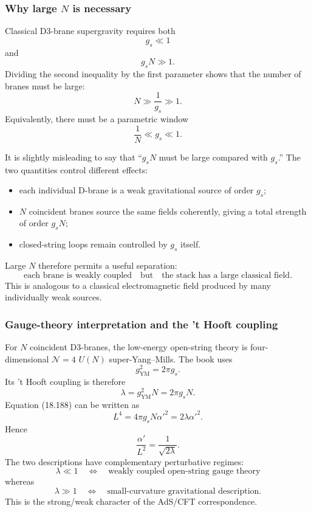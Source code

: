 \documentclass[
  10pt,
  a4paper,
  openany]{book}
\providecommand{\tightlist}{%
  \setlength{\itemsep}{0pt}\setlength{\parskip}{0pt}}
\begin{document}
\subsubsection{\texorpdfstring{Why large \(N\) is
necessary}{Why large N is necessary}}\label{why-large-n-is-necessary}

Classical D3-brane supergravity requires both \[
g_s\ll1
\] and \[
g_sN\gg1.
\] Dividing the second inequality by the first parameter shows that the
number of branes must be large: \[
N\gg\frac1{g_s}\gg1.
\] Equivalently, there must be a parametric window \[
\boxed{
\frac1N\ll g_s\ll1
}.
\]

It is slightly misleading to say that ``\(g_sN\) must be large compared
with \(g_s\).'' The two quantities control different effects:

\begin{itemize}
\tightlist
\item
  each individual D-brane is a weak gravitational source of order
  \(g_s\);
\item
  \(N\) coincident branes source the same fields coherently, giving a
  total strength of order \(g_sN\);
\item
  closed-string loops remain controlled by \(g_s\) itself.
\end{itemize}

Large \(N\) therefore permits a useful separation: \[
\boxed{
\text{each brane is weakly coupled}
\quad\text{but}\quad
\text{the stack has a large classical field}
}.
\] This is analogous to a classical electromagnetic field produced by
many individually weak sources.

\subsubsection{Gauge-theory interpretation and the 't Hooft
coupling}\label{gauge-theory-interpretation-and-the-t-hooft-coupling}

For \(N\) coincident D3-branes, the low-energy open-string theory is
four-dimensional \(\mathcal N=4\) \(U(N)\) super-Yang--Mills. The book
uses \[
g_{\mathrm{YM}}^2=2\pi g_s.
\] Its 't Hooft coupling is therefore \[
\lambda
=g_{\mathrm{YM}}^2N
=2\pi g_sN.
\] Equation (18.188) can be written as \[
L^4
=4\pi g_sN\alpha'^2
=2\lambda\alpha'^2.
\] Hence \[
\frac{\alpha'}{L^2}
=\frac1{\sqrt{2\lambda}}.
\] The two descriptions have complementary perturbative regimes: \[
\boxed{
\lambda\ll1
\quad\Longleftrightarrow\quad
\text{weakly coupled open-string gauge theory}
}
\] whereas \[
\boxed{
\lambda\gg1
\quad\Longleftrightarrow\quad
\text{small-curvature gravitational description}
}.
\] This is the strong/weak character of the AdS/CFT correspondence.
\end{document}
